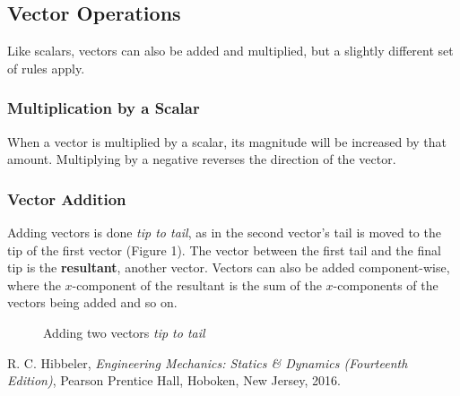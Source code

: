 \documentclass[12pt]{article}
\begin{document}
\subsection{Vector Operations}
Like scalars, vectors can also be added and multiplied, but a slightly different set of rules apply.

\subsubsection*{Multiplication by a Scalar}
When a vector is multiplied by a scalar, its magnitude will be increased by that amount. 
Multiplying by a negative reverses the direction of the vector.

\subsubsection*{Vector Addition}
Adding vectors is done \textit{tip to tail}, as in the second vector's tail is moved to the tip of the first vector (Figure 1).
The vector between the first tail and the final tip is the \textbf{resultant}, another vector.
Vectors can also be added component-wise, where the $x$-component of the resultant is the sum of the $x$-components of the vectors being added and so on.

\begin{figure}
\centering
{}
\caption{Adding two vectors \textit{tip to tail}}
\end{figure}


\pagebreak
{}
\begin{thebibliography}{2}
    R. C. Hibbeler, \textit{Engineering Mechanics: Statics \& Dynamics (Fourteenth Edition)}, Pearson Prentice Hall, Hoboken, New Jersey, 2016.
\end{thebibliography}
\end{document}

